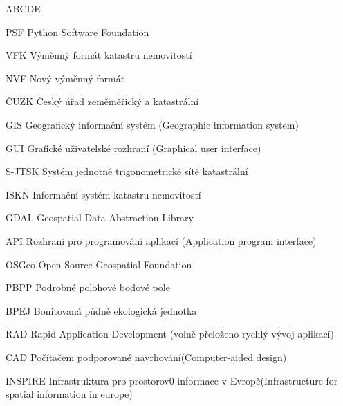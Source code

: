 
\begin{seznamzkratek}{ABCDE}

		  {PSF}
	      {Python Software Foundation}
	      
		  {VFK}
	      {Výměnný formát katastru nemovitostí}
	      
		  {NVF}
	      {Nový výměnný formát}
	      
	      {ČUZK}
	      {Český úřad zeměměřický a katastrální}

	      {GIS}
	      {Geografický informační systém (Geographic information system)}
	         
	      {GUI}
	      {Grafické uživatelské rozhraní (Graphical user interface)}
	           
	      {S-JTSK}
	      {Systém jednotné trigonometrické sítě katastrální}
	  
	      {ISKN}
	      {Informační systém katastru nemovitostí}        
	      
	      {GDAL}
	      {Geospatial Data Abstraction Library}
	      
	      {API}
	      {Rozhraní pro programování aplikací (Application program interface)}    
	      
	      {OSGeo}
	      {Open Source Geospatial Foundation}
	      
	      {PBPP}
	      {Podrobné polohové bodové pole}

	      {BPEJ}
	      {Bonitovaná půdně ekologická jednotka}
	      
	      {RAD}
	      {Rapid Application Development (volně přeloženo rychlý vývoj aplikací)}
	      
	      {CAD}
	      {Počítačem podporované navrhování(Computer-aided design)}
	      
	 	  {INSPIRE}
	 	  {Infrastruktura pro prostorov0 informace v Evropě(Infrastructure for spatial information in europe)}
	        
\end{seznamzkratek}